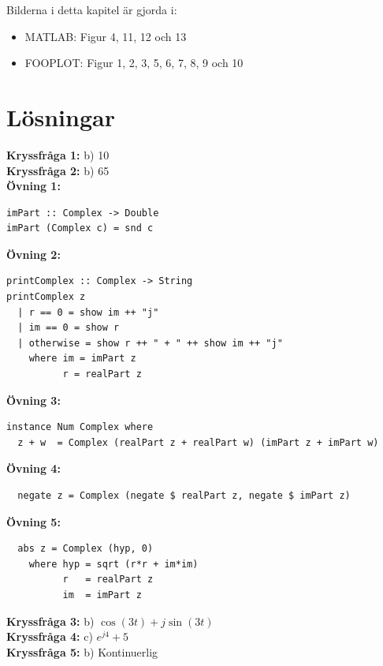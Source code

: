 \documentclass{article}
\begin{document}
Bilderna i detta kapitel är gjorda i:
\begin{itemize}
\item MATLAB: Figur 4, 11, 12 och 13
\item FOOPLOT: Figur 1, 2, 3, 5, 6, 7, 8, 9 och 10
\end{itemize}

\newpage
\section{Lösningar}

\textbf{Kryssfråga 1:} b) 10
\\

\textbf{Kryssfråga 2:} b) 65
\\

\textbf{Övning 1:}
\begin{verbatim}
imPart :: Complex -> Double
imPart (Complex c) = snd c
\end{verbatim}

\textbf{Övning 2:}
\begin{verbatim}
printComplex :: Complex -> String
printComplex z
  | r == 0 = show im ++ "j"
  | im == 0 = show r
  | otherwise = show r ++ " + " ++ show im ++ "j"
    where im = imPart z
          r = realPart z
\end{verbatim}

\textbf{Övning 3:}
\begin{verbatim}
instance Num Complex where
  z + w  = Complex (realPart z + realPart w) (imPart z + imPart w)
\end{verbatim}

\textbf{Övning 4:}
\begin{verbatim}
  negate z = Complex (negate $ realPart z, negate $ imPart z)
\end{verbatim}

\textbf{Övning 5:}
\begin{verbatim}
  abs z = Complex (hyp, 0)
    where hyp = sqrt (r*r + im*im)
          r   = realPart z
          im  = imPart z
\end{verbatim}

\textbf{Kryssfråga 3:} b) $\cos(3t) + j\sin(3t)$
\\

\textbf{Kryssfråga 4:} c) $e^{j4} + 5$
\\

\textbf{Kryssfråga 5:} b) Kontinuerlig

\newpage
\end{document}
